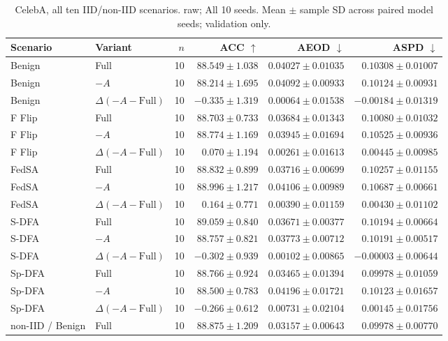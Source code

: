 \begin{table}[t]
\centering
\small
\caption{CelebA, all ten IID/non-IID scenarios. raw; All 10 seeds. Mean $\pm$ sample SD across paired model seeds; validation only.}
\begin{tabular}{llrrrr}
\toprule
Scenario & Variant & $n$ & ACC $\uparrow$ & AEOD $\downarrow$ & ASPD $\downarrow$ \\
\midrule
Benign & Full & 10 & $88.549 \pm 1.038$ & $0.04027 \pm 0.01035$ & $0.10308 \pm 0.01007$ \\
Benign & $-A$ & 10 & $88.214 \pm 1.695$ & $0.04092 \pm 0.00933$ & $0.10124 \pm 0.00931$ \\
Benign & $\Delta(-A-\mathrm{Full})$ & 10 & $-0.335 \pm 1.319$ & $0.00064 \pm 0.01538$ & $-0.00184 \pm 0.01319$ \\
F Flip & Full & 10 & $88.703 \pm 0.733$ & $0.03684 \pm 0.01343$ & $0.10080 \pm 0.01032$ \\
F Flip & $-A$ & 10 & $88.774 \pm 1.169$ & $0.03945 \pm 0.01694$ & $0.10525 \pm 0.00936$ \\
F Flip & $\Delta(-A-\mathrm{Full})$ & 10 & $0.070 \pm 1.194$ & $0.00261 \pm 0.01613$ & $0.00445 \pm 0.00985$ \\
FedSA & Full & 10 & $88.832 \pm 0.899$ & $0.03716 \pm 0.00699$ & $0.10257 \pm 0.01155$ \\
FedSA & $-A$ & 10 & $88.996 \pm 1.217$ & $0.04106 \pm 0.00989$ & $0.10687 \pm 0.00661$ \\
FedSA & $\Delta(-A-\mathrm{Full})$ & 10 & $0.164 \pm 0.771$ & $0.00390 \pm 0.01159$ & $0.00430 \pm 0.01102$ \\
S-DFA & Full & 10 & $89.059 \pm 0.840$ & $0.03671 \pm 0.00377$ & $0.10194 \pm 0.00664$ \\
S-DFA & $-A$ & 10 & $88.757 \pm 0.821$ & $0.03773 \pm 0.00712$ & $0.10191 \pm 0.00517$ \\
S-DFA & $\Delta(-A-\mathrm{Full})$ & 10 & $-0.302 \pm 0.939$ & $0.00102 \pm 0.00865$ & $-0.00003 \pm 0.00644$ \\
Sp-DFA & Full & 10 & $88.766 \pm 0.924$ & $0.03465 \pm 0.01394$ & $0.09978 \pm 0.01059$ \\
Sp-DFA & $-A$ & 10 & $88.500 \pm 0.783$ & $0.04196 \pm 0.01721$ & $0.10123 \pm 0.01657$ \\
Sp-DFA & $\Delta(-A-\mathrm{Full})$ & 10 & $-0.266 \pm 0.612$ & $0.00731 \pm 0.02104$ & $0.00145 \pm 0.01756$ \\
non-IID / Benign & Full & 10 & $88.875 \pm 1.209$ & $0.03157 \pm 0.00643$ & $0.09978 \pm 0.00770$ \\

\end{tabular}
\end{table}

